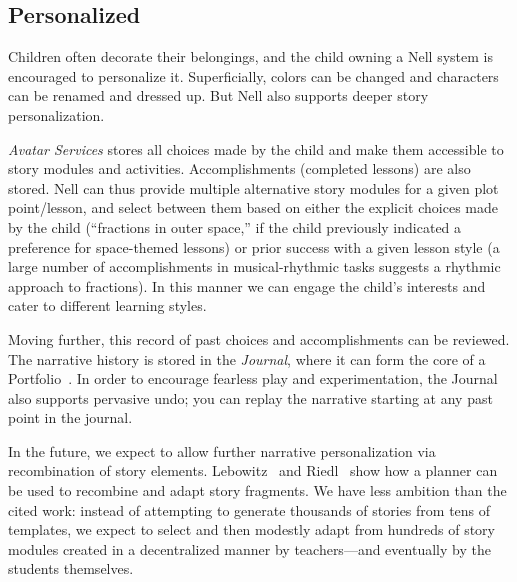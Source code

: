 \documentclass[preprint]{sig-alternate}
\begin{document}

\subsection{Personalized}


Children often decorate their belongings, and the
child owning a Nell system is encouraged to personalize it.
Superficially, colors can be changed and characters can be renamed and
dressed up.  But Nell also supports deeper story personalization.

\textit{Avatar Services} stores all choices made by the child and make them
accessible to story modules and activities.  Accomplishments
(completed lessons) are also stored.  Nell can thus provide multiple
alternative story modules for a given plot point/lesson, and select
between them based on either the explicit choices made by the child
(``fractions in outer space,'' if the child previously indicated a
preference for space-themed lessons) or prior success with a given
lesson style (a large number of accomplishments in musical-rhythmic
tasks suggests a rhythmic approach to fractions).  In this manner we
can engage the child's interests and cater to different learning
styles.%

Moving further, this record of past choices and accomplishments can be
reviewed.  The narrative history is stored in the \textit{Journal},
where it can form the core of a Portfolio~\cite{stefanakis:portfolios}.
In order to encourage fearless play and experimentation, the Journal
also supports pervasive undo; you can replay the narrative starting at
any past point in the journal.

In the future, we expect to allow further narrative personalization
via recombination of story elements.
Lebowitz~\cite{lebowitz:universe85} and Riedl~\cite{riedl:planning}
show how a planner can be used to recombine and adapt story fragments.
We have less ambition than the cited work: instead of
attempting to generate thousands of stories from tens of templates, we
expect to select and then modestly adapt from hundreds of story
modules created in a decentralized manner by teachers---and eventually
by the students themselves.
\end{document}
